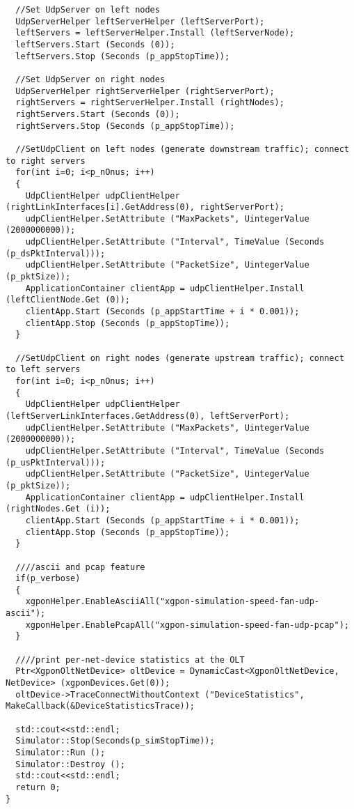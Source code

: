 \begin{lstlisting}
  //Set UdpServer on left nodes
  UdpServerHelper leftServerHelper (leftServerPort);
  leftServers = leftServerHelper.Install (leftServerNode);
  leftServers.Start (Seconds (0));
  leftServers.Stop (Seconds (p_appStopTime));

  //Set UdpServer on right nodes
  UdpServerHelper rightServerHelper (rightServerPort);
  rightServers = rightServerHelper.Install (rightNodes);
  rightServers.Start (Seconds (0));
  rightServers.Stop (Seconds (p_appStopTime));

  //SetUdpClient on left nodes (generate downstream traffic); connect to right servers
  for(int i=0; i<p_nOnus; i++)
  {
    UdpClientHelper udpClientHelper (rightLinkInterfaces[i].GetAddress(0), rightServerPort);
    udpClientHelper.SetAttribute ("MaxPackets", UintegerValue (2000000000));
    udpClientHelper.SetAttribute ("Interval", TimeValue (Seconds (p_dsPktInterval)));
    udpClientHelper.SetAttribute ("PacketSize", UintegerValue (p_pktSize));
    ApplicationContainer clientApp = udpClientHelper.Install (leftClientNode.Get (0));
    clientApp.Start (Seconds (p_appStartTime + i * 0.001));
    clientApp.Stop (Seconds (p_appStopTime));
  }

  //SetUdpClient on right nodes (generate upstream traffic); connect to left servers
  for(int i=0; i<p_nOnus; i++)
  {
    UdpClientHelper udpClientHelper (leftServerLinkInterfaces.GetAddress(0), leftServerPort);
    udpClientHelper.SetAttribute ("MaxPackets", UintegerValue (2000000000));
    udpClientHelper.SetAttribute ("Interval", TimeValue (Seconds (p_usPktInterval)));
    udpClientHelper.SetAttribute ("PacketSize", UintegerValue (p_pktSize));
    ApplicationContainer clientApp = udpClientHelper.Install (rightNodes.Get (i));
    clientApp.Start (Seconds (p_appStartTime + i * 0.001));
    clientApp.Stop (Seconds (p_appStopTime));
  }

  ////ascii and pcap feature
  if(p_verbose)
  {
    xgponHelper.EnableAsciiAll("xgpon-simulation-speed-fan-udp-ascii");
    xgponHelper.EnablePcapAll("xgpon-simulation-speed-fan-udp-pcap");
  }

  ////print per-net-device statistics at the OLT
  Ptr<XgponOltNetDevice> oltDevice = DynamicCast<XgponOltNetDevice, NetDevice> (xgponDevices.Get(0));
  oltDevice->TraceConnectWithoutContext ("DeviceStatistics", MakeCallback(&DeviceStatisticsTrace));

  std::cout<<std::endl;
  Simulator::Stop(Seconds(p_simStopTime));
  Simulator::Run ();
  Simulator::Destroy ();
  std::cout<<std::endl;
  return 0;
}

\end{lstlisting}
